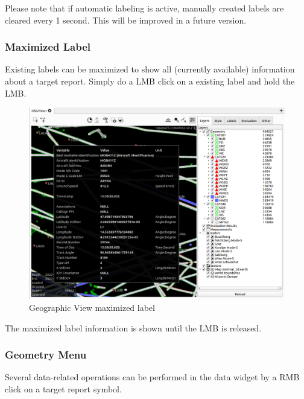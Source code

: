 Please note that if automatic labeling is active, manually created labels are cleared every 1 second. This will be improved in a future version.

\subsubsection{Maximized Label}

Existing labels can be maximized to show all (currently available) information about a target report. Simply do a LMB click on a existing label and hold the LMB.

\begin{figure}[H]
    \hspace*{-2.5cm}
    \includegraphics[width=19cm,frame]{figures/geoview_max_label.png}
  \caption{Geographic View maximized label}
\end{figure}

The maximized label information is shown until the LMB is released.

\subsubsection{Geometry Menu}

Several data-related operations can be performed in the data widget by a RMB click on a target report symbol.

